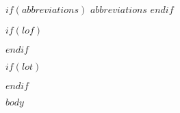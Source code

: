 \documentclass[a4paper,11pt]{article}
\begin{document}
$if(abbreviations)$
\newpage
$abbreviations$
$endif$

$if(lof)$
\newpage
\listoffigures
{}
$endif$

$if(lot)$
\newpage
\listoftables
{}
$endif$

\newpage
\pagestyle{plain}
\setcounter{page}{1}    %

$body$
\end{document}
